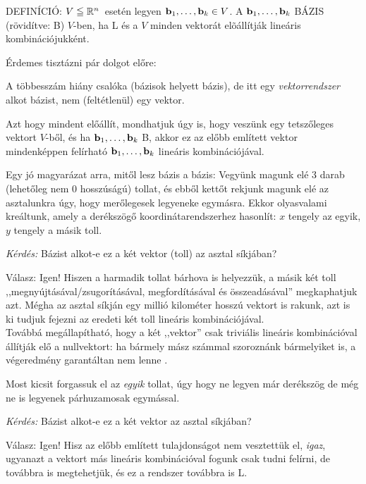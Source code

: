 \documentclass[a4paper,11.5pt]{article}
\begin{document}
	DEFINÍCIÓ: $V\leqq\mathbb{R}^{n}$~esetén legyen $\textbf{b} _1, \dots, \textbf{b} _k \in
	V$. A $\textbf{b}
	_1, \dots, \textbf{b} _k$ BÁZIS (rövidítve: B) $V$-ben, ha L és a $V$
	minden vektorát elõállítják lineáris kombinációjukként.  
	\medskip
	
	\noindent Érdemes tisztázni pár dolgot előre:
	\begin{compactitem}
		\item A többesszám hiány csalóka (bázisok helyett bázis), de itt egy \emph{vektorrendszer} alkot bázist, nem (feltétlenül) egy vektor.
		\item Azt hogy mindent előállít, mondhatjuk úgy is, hogy veszünk egy tetszőleges vektort $V$-ből, és ha $\textbf{b} _1, \dots, \textbf{b} _k$ B, akkor ez az előbb említett vektor mindenképpen felírható $\textbf{b} _1, \dots, \textbf{b} _k$ lineáris kombinációjával.
	\end{compactitem}
	Egy jó magyarázat arra, mitől lesz bázis a bázis: Vegyünk magunk elé 3 darab (lehetőleg nem 0 hosszúságú) tollat, és ebből kettőt rekjunk magunk elé az asztalunkra úgy, hogy merőlegesek legyeneke egymásra. Ekkor olyasvalami kreáltunk, amely a derékszögő koordinátarendszerhez hasonlít: $x$ tengely az egyik, $y$ tengely a másik toll.
	
	\begin{center}
		\emph{Kérdés:} Bázist alkot-e ez a két vektor (toll) az asztal síkjában? 
	\end{center}
	
	Válasz: Igen! Hiszen a harmadik tollat bárhova is helyezzük,  a másik két toll ,,megnyújtásával/zsugorításával, megfordításával és összeadásával'' megkaphatjuk azt. Mégha az asztal síkján egy millió kilométer hosszú vektort is rakunk, azt is ki tudjuk fejezni az eredeti két toll lineáris kombinációjával.\\
	Továbbá megállapítható, hogy a két ,,vektor'' csak triviális lineáris kombinációval állítják elő a nullvektort: ha bármely mász számmal szoroznánk bármelyiket is, a végeredmény garantáltan nem lenne \0.
	
	\medskip
	Most kicsit forgassuk el az \emph{egyik} tollat, úgy hogy ne legyen már derékszög de még ne is legyenek párhuzamosak egymással.
	
	\begin{center}
		\emph{Kérdés:} Bázist alkot-e ez a két vektor az asztal síkjában?
	\end{center}
	
	Válasz: Igen! Hisz az előbb említett tulajdonságot nem vesztettük el, \emph{igaz}, ugyanazt a vektort más lineáris kombinációval fogunk csak tudni felírni, de továbbra is megtehetjük, és ez a rendszer továbbra is L.
	
\end{document}
